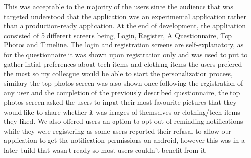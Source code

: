 This was acceptable to the majority of the users since the audience that was targeted understood that the application was an experimental application rather than a production-ready application.
\newline
\newline
At the end of development, the application consisted of 5 different screens being, Login, Register, A Questionnaire, Top Photos and Timeline. The login and registration screens are self-explanatory, as for the questionnaire it was shown upon registration only and was used to put to gather intial preferences about tech items and clothing items the users prefered the most so my colleague would be able to start the personalization process, similary the top photos screen was also shown once following the
registration of any user and the completion of the previously described questionnaire, the top photos screen asked the users to input their most favourite pictures that they would like to share whether it was images of themselves or clothing/tech items they liked.
We also offered users an option to opt-out of reminding notifications while they were registering as some users reported their refusal to allow our application to get the notification permissions on android, however this was in a later build that wasn't ready so most users couldn't benefit from it. 
\newline
\newline
\newline
\newline
\newline
